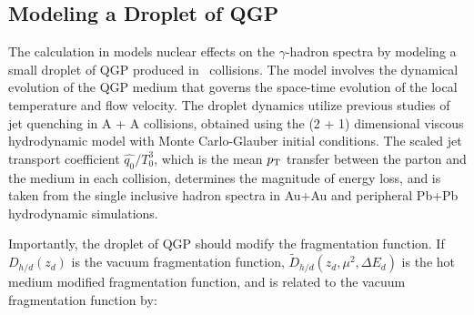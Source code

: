 {%



\FloatBarrier
\subsection{Modeling a Droplet of QGP}
The calculation in \cite{Xie2021} models nuclear effects on the $\gamma$-hadron spectra by modeling a small droplet of QGP produced in \pPb~collisions. The model involves the dynamical evolution of the QGP medium that governs the space-time evolution of the local temperature and flow velocity. The droplet dynamics utilize previous studies of jet quenching in A + A collisions, obtained using the (2 + 1) dimensional viscous hydrodynamic model with Monte Carlo-Glauber initial conditions. The scaled jet transport coefficient $\hat{q_0}/T^3_0$, which is the mean $p_{\mathrm{T}}$ transfer between the parton and the medium in each collision, determines the magnitude of energy loss, and is taken from the single inclusive hadron spectra in Au+Au and peripheral Pb+Pb hydrodynamic simulations. 

Importantly, the droplet of QGP should modify the fragmentation function. If $D_{h / d}\left(z_{d}\right)$ is the vacuum fragmentation function, $\tilde{D}_{h / d}\left(z_{d}, \mu^{2}, \Delta E_{d}\right)$ is the hot medium modified fragmentation function, and is related to the vacuum fragmentation function by:

}
